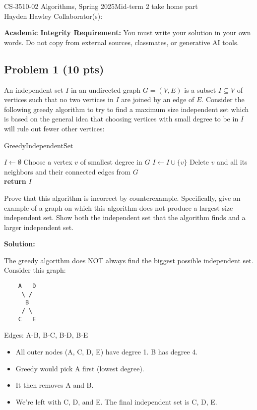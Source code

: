 \documentclass[12pt]{article}
\begin{document}
\noindent CS-3510-02 Algorithms, Spring 2025\hfill Mid-term 2 take home part\\
Hayden Hawley \hfill Collaborator(s):

\hrulefill

\textbf{Academic Integrity Requirement:} You must write your solution in your own words. Do not copy from external sources, classmates, or generative AI tools.

\subsection*{Problem 1 (10 pts)}

An independent set $I$ in an undirected graph $G = (V, E)$ is a subset $I \subseteq V$ of vertices such that no two vertices in $I$ are joined by an edge of $E$. Consider the following greedy algorithm to try to find a maximum size independent set which is based on the general idea that choosing vertices with small degree to be in $I$ will rule out fewer other vertices:

\begin{algorithm}
\caption{GreedyIndependentSet}
\begin{algorithmic}[1]
\State $I \gets \emptyset$
    \State Choose a vertex $v$ of smallest degree in $G$ 
    \State $I \gets I \cup \{v\}$
    \State Delete $v$ and all its neighbors and their connected edges from $G$\\
\EndWhile
\State \textbf{return} $I$
\end{algorithmic}
\end{algorithm}

Prove that this algorithm is incorrect by counterexample. Specifically, give an example of a graph on which this algorithm does not produce a largest size independent set. Show both the independent set that the algorithm finds and a larger independent set.

\textbf{Solution:}

The greedy algorithm does NOT always find the biggest possible independent set. Consider this graph:

\begin{verbatim}
    A   D
     \ /
      B
     / \
    C   E
\end{verbatim}

Edges: A-B, B-C, B-D, B-E

\begin{itemize}
  \item All outer nodes (A, C, D, E) have degree 1. B has degree 4.
  \item Greedy would pick A first (lowest degree).
  \item It then removes A and B.
  \item We're left with C, D, and E. The final independent set is {C, D, E}.
\end{itemize}
\end{document}
